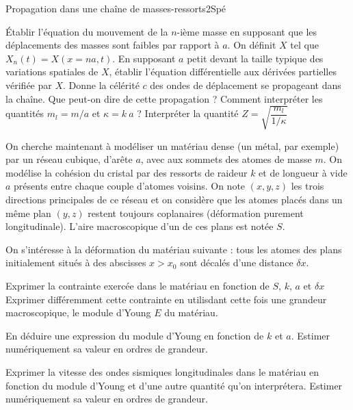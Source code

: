 \begin{exercise}{Propagation dans une chaîne de masses-ressorts}{2}{Spé}
\begin{questions}
    \question Établir l'équation du mouvement de la $n$-ième masse en supposant que les déplacements des masses sont faibles par rapport à $a$.
    \question On définit $X$ tel que $X_n(t) = X(x = na, t)$. En supposant $a$ petit devant la taille typique des variations spatiales de $X$, établir l'équation différentielle aux dérivées partielles vérifiée par $X$.
    \question Donne la célérité $c$ des ondes de déplacement se propageant dans la chaîne. Que peut-on dire de cette propagation ?
    \question Comment interpréter les quantités $m_l = m/a$ et $\kappa = k\ a$ ?
    \question Interpréter la quantité $Z = \sqrt{\dfrac{m_l}{1/\kappa}}$
\end{questions}


On cherche maintenant à modéliser un matériau dense (un métal, par exemple) par un réseau cubique, d'arête $a$, avec aux sommets des atomes de masse $m$. On modélise la cohésion du cristal par des ressorts de raideur $k$ et de longueur à vide $a$ présents entre chaque couple d'atomes voisins. On note $(x, y, z)$ les trois directions principales de ce réseau et on considère que les atomes placés dans un même plan $(y, z)$ restent toujours coplanaires (déformation purement longitudinale). L'aire macroscopique d'un de ces plans est notée $S$.

On s'intéresse à la déformation du matériau suivante : tous les atomes des plans initialement situés à des abscisses $x > x_0$ sont décalés d'une distance $\delta x$.

\begin{questions}
    \question Exprimer la contrainte exercée dans le matériau en fonction de $S$, $k$, $a$ et $\delta x$
    \question Exprimer différemment cette contrainte en utilisdant cette fois une grandeur macroscopique, le module d'Young $E$ du matériau.
    
    \question En déduire une expression du module d'Young en fonction de $k$ et $a$. Estimer numériquement sa valeur en ordres de grandeur.
    
    \question Exprimer la vitesse des ondes sismiques longitudinales dans le matériau en fonction du module d'Young et d'une autre quantité qu'on interprétera. Estimer numériquement sa valeur en ordres de grandeur.

\end{questions}

\end{exercise}